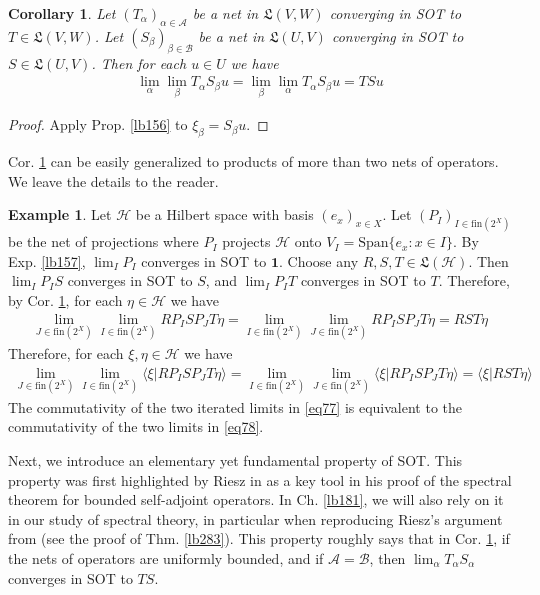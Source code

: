 \documentclass[12pt,b5paper,notitlepage]{article}
\theoremstyle{definition}
\newtheorem{eg}[df]{Example}
\theoremstyle{plain}
\newtheorem{co}[df]{Corollary}
\newcommand{\fk}{\mathfrak}
\newcommand{\idt}{\mathbf{1}}
\newcommand{\Span}{\mathrm{Span}}
\newcommand{\bk}[1]{\langle {#1}\rangle}
\newcommand{\scr}{\mathscr}
\newcommand{\fin}{\mathrm{fin}}
\newcommand{\MH}{\mathcal H}
\numberwithin{equation}{section}
\begin{document}
\begin{co}\label{lb158}
Let $(T_\alpha)_{\alpha\in\scr A}$ be a net in $\fk L(V,W)$ converging in SOT to $T\in\fk L(V,W)$. Let $(S_\beta)_{\beta\in\scr B}$ be a net in $\fk L(U,V)$ converging in SOT to $S\in\fk L(U,V)$. Then for each $u\in U$ we have
\begin{align}
\lim_\alpha \lim_\beta T_\alpha S_\beta u=\lim_\beta\lim_\alpha T_\alpha S_\beta u=TSu
\end{align}
\end{co}

\begin{proof}
Apply Prop. \ref{lb156} to $\xi_\beta= S_\beta u$.
\end{proof}

Cor. \ref{lb158} can be easily generalized to products of more than two nets of operators. We leave the details to the reader.


\begin{eg}\label{lb160}
Let $\MH$ be a Hilbert space with basis $(e_x)_{x\in X}$. Let $(P_I)_{I\in\fin(2^X)}$ be the net of projections where $P_I$ projects $\MH$ onto $V_I=\Span\{e_x:x\in I\}$. By Exp. \ref{lb157}, $\lim_I P_I$ converges in SOT to $\idt$. Choose any $R,S,T\in\fk L(\MH)$. Then $\lim_I P_IS$ converges in SOT to $S$, and $\lim_I P_IT$ converges in SOT to $T$. Therefore, by Cor. \ref{lb158}, for each $\eta\in\MH$ we have
\begin{align*}
\lim_{J\in\fin(2^X)}\lim_{I\in\fin(2^X)}RP_ISP_JT\eta=\lim_{I\in\fin(2^X)}\lim_{J\in\fin(2^X)}RP_ISP_JT\eta=RST\eta
\end{align*}
Therefore, for each $\xi,\eta\in\MH$ we have
\begin{align}\label{eq77}
\lim_{J\in\fin(2^X)}\lim_{I\in\fin(2^X)}\bk{\xi|RP_ISP_JT\eta}=\lim_{I\in\fin(2^X)}\lim_{J\in\fin(2^X)}\bk{\xi|RP_ISP_JT\eta}=\bk{\xi|RST\eta}
\end{align}
The commutativity of the two iterated limits in \eqref{eq77} is equivalent to the commutativity of the two limits in \eqref{eq78}.
\end{eg}




Next, we introduce an elementary yet fundamental property of SOT. This property was first highlighted by Riesz in \cite{Rie13} as a key tool in his proof of the spectral theorem for bounded self-adjoint operators. In Ch. \ref{lb181}, we will also rely on it in our study of spectral theory, in particular when reproducing Riesz's argument from \cite{Rie13} (see the proof of Thm. \ref{lb283}). This property roughly says that in Cor. \ref{lb158}, if the nets of operators are uniformly bounded, and if $\scr A=\scr B$, then $\lim_\alpha T_\alpha S_\alpha$ converges in SOT to $TS$.
\end{document}
